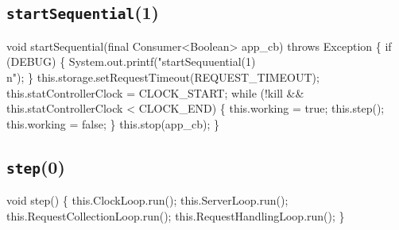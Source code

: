 \subsection{\texttt{startSequential}(1)}
\nwenddocs{}\endmoddef{}
void startSequential(final Consumer<Boolean> app_cb) throws Exception \{
  if (DEBUG) \{
    System.out.printf("startSequuential(1)\\n");
  \}
  this.storage.setRequestTimeout(REQUEST_TIMEOUT);
  this.statControllerClock = CLOCK_START;
  while (!kill && this.statControllerClock < CLOCK_END) \{
    this.working = true;
    this.step();
    this.working = false;
  \}
  this.stop(app_cb);
\}
\eatline
{}\nwendcode{}\nwdocspar
\subsection{\texttt{step}(0)}
\nwenddocs{}\endmoddef{}
void step() \{
  this.ClockLoop.run();
  this.ServerLoop.run();
  this.RequestCollectionLoop.run();
  this.RequestHandlingLoop.run();
\}
\nwendcode{}\nwdocspar

